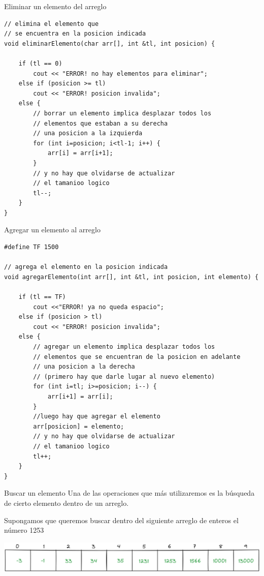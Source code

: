 \documentclass[12pt]{beamer}
\begin{document}
\begin{frame}[fragile]{Eliminar un elemento del arreglo}
\begin{lstlisting}[basicstyle=\scriptsize]
// elimina el elemento que 
// se encuentra en la posicion indicada
void eliminarElemento(char arr[], int &tl, int posicion) {
    
    if (tl == 0)
        cout << "ERROR! no hay elementos para eliminar";
    else if (posicion >= tl)
        cout << "ERROR! posicion invalida";
    else {
        // borrar un elemento implica desplazar todos los 
        // elementos que estaban a su derecha
        // una posicion a la izquierda
        for (int i=posicion; i<tl-1; i++) {
            arr[i] = arr[i+1];
        }
        // y no hay que olvidarse de actualizar
        // el tamanioo logico
        tl--;
    }
}
\end{lstlisting}
\end{frame}
    
\begin{frame}[fragile]{Agregar un elemento al arreglo}
\begin{lstlisting}[basicstyle=\tiny]
#define TF 1500

// agrega el elemento en la posicion indicada
void agregarElemento(int arr[], int &tl, int posicion, int elemento) {
    
    if (tl == TF)
        cout <<"ERROR! ya no queda espacio";
    else if (posicion > tl)
        cout << "ERROR! posicion invalida";
    else {
        // agregar un elemento implica desplazar todos los 
        // elementos que se encuentran de la posicion en adelante
        // una posicion a la derecha
        // (primero hay que darle lugar al nuevo elemento)
        for (int i=tl; i>=posicion; i--) {
            arr[i+1] = arr[i];
        }
        //luego hay que agregar el elemento
        arr[posicion] = elemento;
        // y no hay que olvidarse de actualizar
        // el tamanioo logico
        tl++;
    }
}
\end{lstlisting}
\end{frame}

\begin{frame}{Buscar un elemento}
    Una de las operaciones que más utilizaremos es la \alert{búsqueda} de cierto elemento dentro de un arreglo.
    
    \medskip
    
    Supongamos que queremos buscar dentro del siguiente arreglo de enteros el número \alert{1253}
    
    \medskip
    
    \includegraphics[width=\textwidth]{arreglo_inicial_busqueda.png}
\end{frame}
\end{document}
